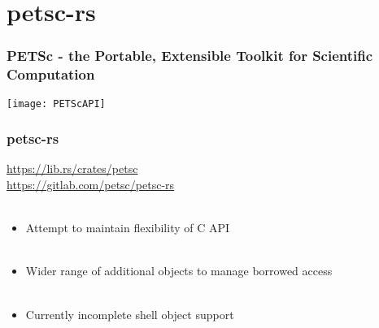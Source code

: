 \documentclass{beamer}
\begin{document}
\section{petsc-rs}

\begin{frame}
\begin{center}
\frametitle{PETSc - the Portable, Extensible Toolkit for Scientific Computation}

\texttt{[image: PETScAPI]}\cite{petsc}

\end{center}
\end{frame}


\begin{frame}
\begin{center}
\frametitle{petsc-rs}

\href{https://lib.rs/crates/petsc}{https://lib.rs/crates/petsc}\\

\href{https://gitlab.com/petsc/petsc-rs}{https://gitlab.com/petsc/petsc-rs}\\

~\\

\begin{itemize}

\item Attempt to maintain flexibility of C API\\

~\\

\item Wider range of additional objects to manage borrowed access\\

~\\

\item Currently incomplete shell object support\\

\end{itemize}

\end{center}
\end{frame}

\end{document}
